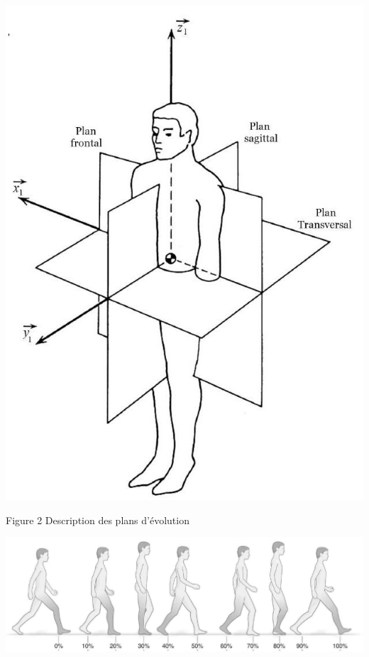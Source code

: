 \documentclass[10pt]{article}
\begin{document}
\begin{center}
\includegraphics[max width=\textwidth]{2023_05_12_54c6a64d2ffce28d5c72g-02}
\end{center}

Figure 2 Description des plans d'évolution

\begin{center}
\includegraphics[max width=\textwidth]{2023_05_12_54c6a64d2ffce28d5c72g-02(1)}
\end{center}
\end{document}
